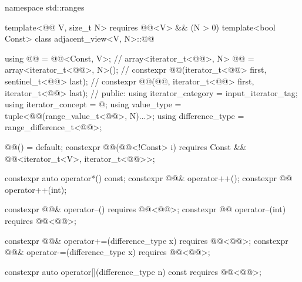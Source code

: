 %
\begin{codeblock}
namespace std::ranges {
  template<@@ V, size_t N>
    requires @@<V> && (N > 0)
  template<bool Const>
  class adjacent_view<V, N>::@@ {
    using @@ = @@<Const, V>;                                         // \expos
    array<iterator_t<@@>, N> @@ = array<iterator_t<@@>, N>();         // \expos
    constexpr @@(iterator_t<@@> first, sentinel_t<@@> last);          // \expos
    constexpr @@(@@, iterator_t<@@> first, iterator_t<@@> last);
                                                                                // \expos
  public:
    using iterator_category = input_iterator_tag;
    using iterator_concept  = @\seebelow@;
    using value_type = tuple<@@(range_value_t<@@>, N)...>;
    using difference_type = range_difference_t<@@>;

    @@() = default;
    constexpr @@(@@<!Const> i)
      requires Const && @@<iterator_t<V>, iterator_t<@@>>;

    constexpr auto operator*() const;
    constexpr @@& operator++();
    constexpr @@ operator++(int);

    constexpr @@& operator--() requires @@<@@>;
    constexpr @@ operator--(int) requires @@<@@>;

    constexpr @@& operator+=(difference_type x)
      requires @@<@@>;
    constexpr @@& operator-=(difference_type x)
      requires @@<@@>;

    constexpr auto operator[](difference_type n) const
      requires @@<@@>;

}}
\end{codeblock}
